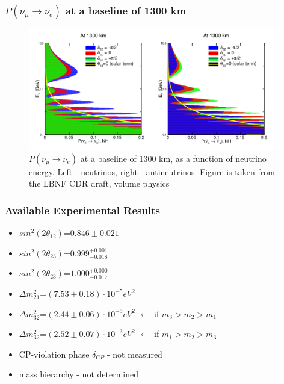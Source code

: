 \begin{frame}\frametitle{$P(\nu_\mu \rightarrow \nu_e)$ at a baseline of 1300 km}
  \scriptsize
  \begin{figure}
  \label{fig:LBNF_oscProbability}
  \centering
  \includegraphics[width=0.98\textwidth, keepaspectratio=true]{figs/LBNF_oscProbability.png}
  \\$P(\nu_\mu \rightarrow \nu_e)$ at a baseline of 1300 km, as a function of neutrino energy. Left - neutrinos, right - antineutrinos. Figure is taken from the LBNF CDR draft, volume physics\cite{ref_LBNFdoc_volume-physics}
  \end{figure}
\end{frame}

\begin{frame}\frametitle{Available Experimental Results \cite{ref_PDG}}
  \scriptsize
  \begin{itemize}
    \item $sin^2(2\theta_{12})$=$0.846\pm0.021$
    \item $sin^2(2\theta_{23})$=$0.999^{+0.001}_{-0.018}$
    \item $sin^2(2\theta_{23})$=$1.000^{+0.000}_{-0.017}$
    \item ${\Delta}m^2_{21}$=$(7.53\pm0.18) \cdot 10^{-5} eV^2$
    \item ${\Delta}m^2_{32}$=$(2.44\pm0.06) \cdot 10^{-3} eV^2$ $\leftarrow$ if $m_3>m_2>m_1$
    \item ${\Delta}m^2_{32}$=$(2.52\pm0.07) \cdot 10^{-3} eV^2$ $\leftarrow$ if $m_1>m_2>m_3$
    \item CP-violation phase $\delta_{CP}$ - not measured
    \item mass hierarchy - not determined
  \end{itemize} 
\end{frame}
